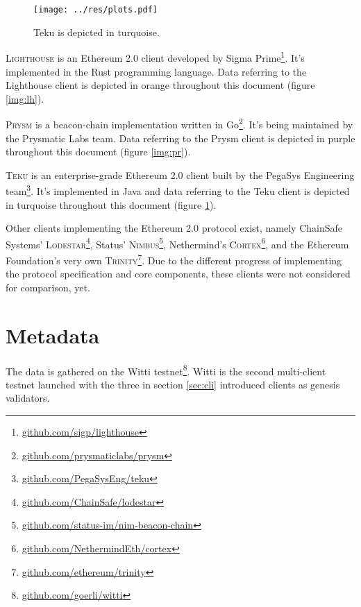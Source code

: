 \documentclass[twoside,twocolumn]{article}
\begin{document}
\begin{figure}[t]
	\centering
	\texttt{[image: ../res/plots.pdf]}
	\caption{Teku is depicted in turquoise.}
	\label{img:tk}
\end{figure}

\textsc{Lighthouse} is an Ethereum 2.0 client developed by Sigma Prime\footnote{\href{https://github.com/sigp/lighthouse}{github.com/sigp/lighthouse}}. It's implemented in the Rust programming language. Data referring to the Lighthouse client is depicted in orange throughout this document (figure \ref{img:lh}).\par

\textsc{Prysm} is a beacon-chain implementation written in Go\footnote{\href{https://github.com/prysmaticlabs/prysm}{github.com/prysmaticlabs/prysm}}. It's being maintained by the Prysmatic Labs team. Data referring to the Prysm client is depicted in purple throughout this document (figure \ref{img:pr}).\par

\textsc{Teku} is an enterprise-grade Ethereum 2.0 client built by the PegaSys Engineering team\footnote{\href{https://github.com/PegaSysEng/teku}{github.com/PegaSysEng/teku}}. It's implemented in Java and data referring to the Teku client is depicted in turquoise throughout this document (figure \ref{img:tk}).\par

Other clients implementing the Ethereum 2.0 protocol exist, namely ChainSafe Systems' \textsc{Lodestar}\footnote{\href{https://github.com/ChainSafe/lodestar}{github.com/ChainSafe/lodestar}}, Status' \textsc{Nimbus}\footnote{\href{https://github.com/status-im/nim-beacon-chain}{github.com/status-im/nim-beacon-chain}}, Nethermind's \textsc{Cortex}\footnote{\href{https://github.com/NethermindEth/cortex}{github.com/NethermindEth/cortex}}, and the Ethereum Foundation's very own \textsc{Trinity}\footnote{\href{https://github.com/ethereum/trinity}{github.com/ethereum/trinity}}. Due to the different progress of implementing the protocol specification and core components, these clients were not considered for comparison, yet.\par

\section{Metadata}
The data is gathered on the Witti testnet\footnote{\href{https://github.com/goerli/witti}{github.com/goerli/witti}}. Witti is the second multi-client testnet launched with the three in section \ref{sec:cli} introduced clients as genesis validators.\par
\end{document}

